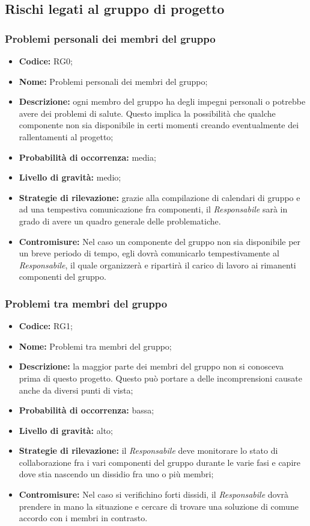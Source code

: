 \documentclass[../PianodiProgetto.tex]{subfiles}
\begin{document}
	\subsection{Rischi legati al gruppo di progetto}
	\subsubsection{Problemi personali dei membri del gruppo}
	\begin{itemize}
		\item \textbf{Codice:} RG0;
		\item \textbf{Nome:} Problemi personali dei membri del gruppo;
		\item \textbf{Descrizione:} ogni membro del gruppo ha degli impegni personali o potrebbe avere dei problemi di salute. Questo implica la possibilità che qualche componente non sia disponibile in certi momenti creando eventualmente dei rallentamenti al progetto;
		\item \textbf{Probabilità di occorrenza:} media;
		\item \textbf{Livello di gravità:} medio;
		\item \textbf{Strategie di rilevazione:} grazie alla compilazione di calendari di gruppo e ad una tempestiva comunicazione fra componenti, il \textit{Responsabile} sarà in grado di avere un quadro generale delle problematiche.
		\item \textbf{Contromisure:} Nel caso un componente del gruppo non sia disponibile per un breve periodo di tempo, egli dovrà comunicarlo tempestivamente al \textit{Responsabile}, il quale organizzerà e ripartirà il carico di lavoro ai rimanenti componenti del gruppo. 
	\end{itemize}
	
	\subsubsection{Problemi tra membri del gruppo}
	\begin{itemize}
		\item \textbf{Codice:} RG1;
		\item \textbf{Nome:} Problemi tra membri del gruppo;
		\item \textbf{Descrizione:} la maggior parte dei membri del gruppo non si conosceva prima di questo progetto. Questo può portare a delle incomprensioni causate anche da diversi punti di vista;
		\item \textbf{Probabilità di occorrenza:} bassa;
		\item \textbf{Livello di gravità:} alto;
		\item \textbf{Strategie di rilevazione:} il \textit{Responsabile} deve monitorare lo stato di collaborazione fra i vari componenti del gruppo durante le varie fasi e capire dove stia nascendo un dissidio fra uno o più membri;
		\item \textbf{Contromisure:} Nel caso si verifichino forti dissidi, il \textit{Responsabile} dovrà prendere in mano la situazione e cercare di trovare una soluzione di comune accordo con i membri in contrasto. 
	\end{itemize}
	
\end{document}
